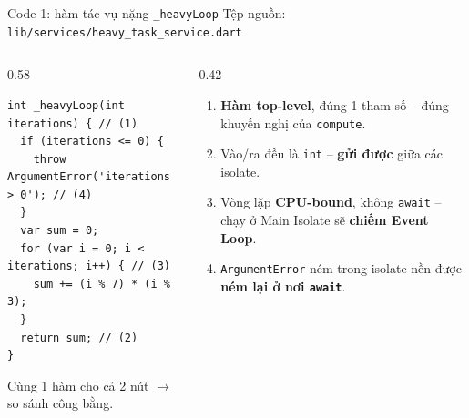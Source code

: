 \documentclass[aspectratio=169,11pt]{beamer}
\newcommand{\cnum}[1]{\textcolor{purpD}{\textbf{(#1)}}}
\begin{document}
\begin{frame}[fragile]{Code 1: hàm tác vụ nặng \texttt{\_heavyLoop}}
  \vspace{-0.25cm}
  {\scriptsize\color{grayD} Tệp nguồn: \texttt{lib/services/heavy\_task\_service.dart}}
  \vspace{0.05cm}
  \begin{columns}[T]
    \begin{column}{0.58\textwidth}
\begin{lstlisting}
int _heavyLoop(int iterations) { // (1)
  if (iterations <= 0) {
    throw ArgumentError('iterations > 0'); // (4)
  }
  var sum = 0;
  for (var i = 0; i < iterations; i++) { // (3)
    sum += (i % 7) * (i % 3);
  }
  return sum; // (2)
}
\end{lstlisting}
      \vspace{0.1cm}
       \scriptsize Cùng 1 hàm cho cả 2 nút $\rightarrow$ so sánh công bằng.
    \end{column}
    \begin{column}{0.42\textwidth}
      \scriptsize
      \begin{enumerate}
        \setlength{\itemsep}{0.12cm}
        \item[\cnum{1}] \textbf{Hàm top-level}, đúng 1 tham số -- đúng khuyến nghị của \texttt{compute}.
        \item[\cnum{2}] Vào/ra đều là \texttt{int} -- \textbf{gửi được} giữa các isolate.
        \item[\cnum{3}] Vòng lặp \textbf{CPU-bound}, không \texttt{await} -- chạy ở Main Isolate sẽ \textbf{chiếm Event Loop}.
        \item[\cnum{4}] \texttt{ArgumentError} ném trong isolate nền được \textbf{ném lại ở nơi \texttt{await}}.
      \end{enumerate}
    \end{column}
  \end{columns}
\end{frame}
\end{document}
